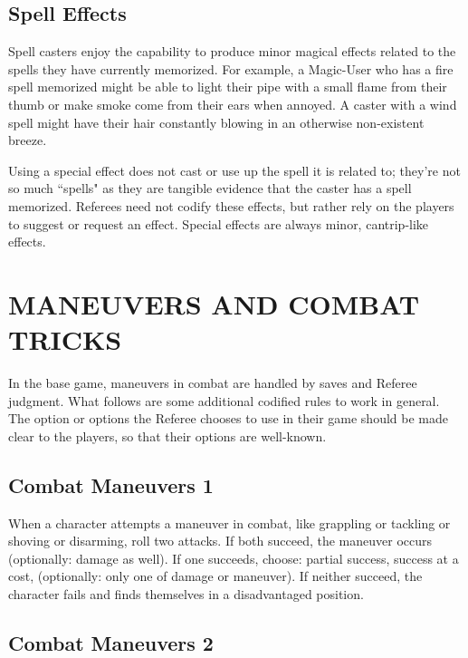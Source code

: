 \documentclass[twoside]{article}
\begin{document}
\subsection*{Spell Effects}

Spell casters enjoy the capability to produce minor magical effects related to the spells they have currently memorized. For example, a Magic-User who has a fire spell memorized might be able to light their pipe with a small flame from their thumb or make smoke come from their ears when annoyed. A caster with a wind spell might have their hair constantly blowing in an otherwise non-existent breeze.

\bigbreak

Using a special effect does not cast or use up the spell it is related to; they're not so much ``spells" as they are tangible evidence that the caster has a spell memorized. Referees need not codify these effects, but rather rely on the players to suggest or request an effect. Special effects are always minor, cantrip-like effects.

\section*{MANEUVERS AND COMBAT TRICKS}

In the base game, maneuvers in combat are handled by saves and Referee judgment. What follows are some additional codified rules to work in general. The option or options the Referee chooses to use in their game should be made clear to the players, so that their options are well-known.

\subsection*{Combat Maneuvers 1}

When a character attempts a maneuver in combat, like grappling or tackling or shoving or disarming, roll two attacks. If both succeed, the maneuver occurs (optionally: damage as well). If one succeeds, choose: partial success, success at a cost, (optionally: only one of damage or maneuver). If neither succeed, the character fails and finds themselves in a disadvantaged position.

\subsection*{Combat Maneuvers 2}
\end{document}

